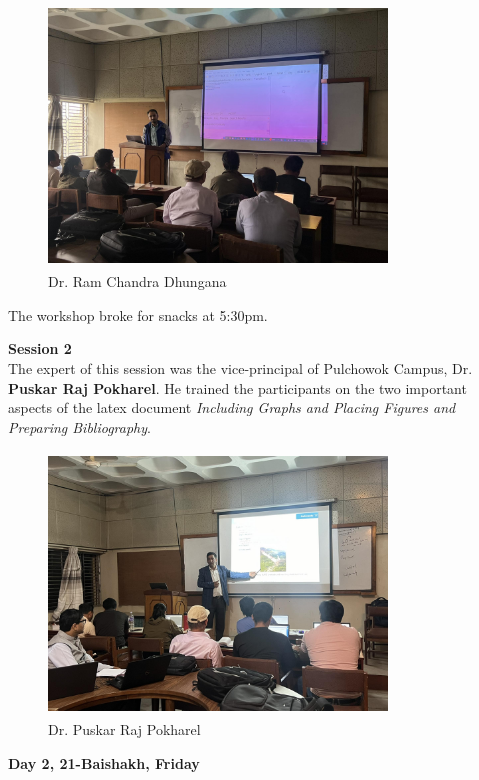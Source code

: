 \documentclass[a4paper,12pt]{report}
\begin{document}
\begin{figure}[h!]
  \centering
  \includegraphics[height=7cm, width=9cm]{rcd.jpg}
  \caption{Dr. Ram Chandra Dhungana}
\end{figure}
\vspace{2mm}
The workshop broke for snacks at 5:30pm.

\vspace{5mm}

{\bfseries \large Session 2}\\[3mm]
The expert of this session was the vice-principal of Pulchowok Campus, Dr. \textbf{Puskar Raj Pokharel}. He trained the participants on the two important aspects of the latex document \textit{Including Graphs and Placing Figures and Preparing Bibliography}.
\vspace{3mm}

\begin{figure}[h!]
  \centering
  \includegraphics[height=7cm, width=9cm]{puskar.jpg}
  \caption{Dr. Puskar Raj Pokharel}
\end{figure}
\clearpage

\begin{center}
  {\bfseries \Large Day 2, 21-Baishakh, Friday}
\end{center}
\vspace{3mm}
\end{document}
